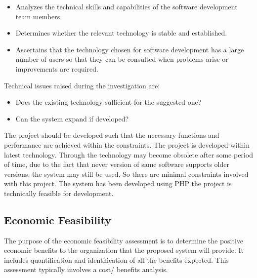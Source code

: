 \begin{itemize}
	\item Analyzes the technical skills and capabilities of the software development team members.
	\item Determines whether the relevant technology is stable and established.
	\item Ascertains that the technology chosen for software development has a large number of users so that they can be consulted when problems arise or improvements are required.
\end{itemize}

Technical issues raised during the investigation are:
\begin{itemize}
	\item Does the existing technology sufficient for the suggested one?
	\item Can the system expand if developed?
\end{itemize}

The project should be developed such that the necessary functions and performance are achieved within the constraints. The project is developed within latest technology. Through the technology may become obsolete after some period of time, due to the fact that never version of same software supports older versions, the system may still be used. So there are minimal constraints involved with this project. The system has been developed using PHP the project is technically feasible for development.

\subsection{Economic Feasibility}
The purpose of the economic feasibility assessment is to determine the positive economic benefits to the organization that the proposed system will provide. It includes quantification and identification of all the benefits expected. This assessment typically involves a cost/ benefits analysis.


